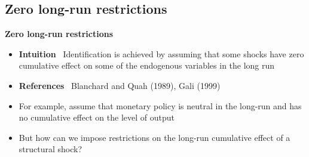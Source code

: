 \documentclass[10pt,english,t,aspectratio=169,ignorenonframetext]{beamer}
\begin{document}

\subsection{Zero long-run restrictions}

\begin{frame}
\vspace{3cm} \color{title}\bigskip

\color{note}
\end{frame}


\begin{frame}
{\textbf{Zero long-run restrictions}}\bigskip \bigskip

\begin{itemize}
\item \textbf{Intuition} \ Identification is achieved by assuming that some
shocks have zero cumulative effect on some of the endogenous variables in
the long run\bigskip\medskip

\item \textbf{References} \ Blanchard and Quah (1989), Gali (1999)\bigskip
\medskip \pause

\item For example, assume that monetary policy is neutral in the long-run
and has no cumulative effect on the level of output\bigskip\medskip\pause

\item But how can we impose restrictions on the long-run cumulative effect
of a structural shock?
\end{itemize}
\end{frame}

\end{document}
